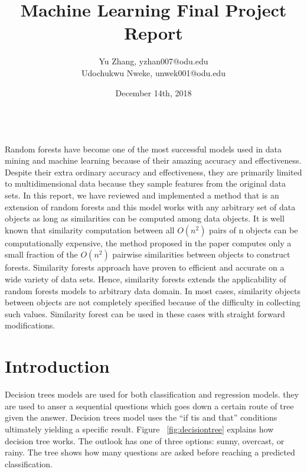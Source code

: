 \documentclass{article}
\begin{document}
%
   \title{Machine Learning Final Project Report}

   \author{Yu Zhang, yzhan007@odu.edu\\  Udochukwu Nweke, unwek001@odu.edu}
   
   \date{December 14th, 2018}

   \maketitle
   
 
  \newpage
    


   \tableofcontents
   
     \newpage
     
     
    \textbf{ \abstractname{}}\\
    
\noindent Random forests have become one of the most successful models used in data mining and machine learning because of their amazing accuracy and effectiveness. Despite their extra ordinary accuracy and effectiveness, they are primarily limited to multidimensional data because they sample features from the original data sets. In this report, we have reviewed and implemented a method that is an extension of random forests and this model works with any arbitrary set of data objects as long as similarities can be computed among data objects. It is well known that similarity computation between all $O(n^2)$ pairs of n objects can be computationally expensive, the method proposed in the paper computes only a small fraction of the $O(n^2)$ pairwise similarities between objects to construct forests. Similarity forests approach have proven to efficient and accurate on a wide variety of data sets. Hence, similarity forests extends the applicability of random forests models to arbitrary data domain. In most cases, similarity objects between objects are not completely specified because of the difficulty in collecting such values. Similarity forest can be used in these cases with straight forward modifications. \\

    
 \newpage
\section{Introduction}
Decision trees models are used for both classification and regression models. they are used to anser a sequential questions which goes down a certain route of tree given the answer. Decision trees model uses the ``if tis and that'' conditions ultimately yielding a specific result. Figure  ~\ref{fig:decisiontree} explains how decision tree works. The outlook has one of three options: sunny, overcast, or rainy. The tree shows how many questions are asked before reaching a predicted classification.\\
\end{document}
